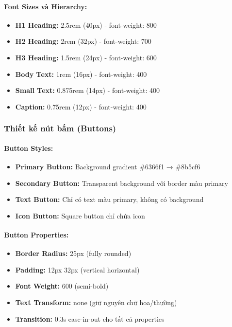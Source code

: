 \paragraph{Font Sizes và Hierarchy:}
\begin{itemize}
    \item \textbf{H1 Heading:} 2.5rem (40px) - font-weight: 800
    \item \textbf{H2 Heading:} 2rem (32px) - font-weight: 700
    \item \textbf{H3 Heading:} 1.5rem (24px) - font-weight: 600
    \item \textbf{Body Text:} 1rem (16px) - font-weight: 400
    \item \textbf{Small Text:} 0.875rem (14px) - font-weight: 400
    \item \textbf{Caption:} 0.75rem (12px) - font-weight: 400
\end{itemize}

\subsubsection{Thiết kế nút bấm (Buttons)}

\paragraph{Button Styles:}
\begin{itemize}
    \item \textbf{Primary Button:} Background gradient \#6366f1 → \#8b5cf6
    \item \textbf{Secondary Button:} Transparent background với border màu primary
    \item \textbf{Text Button:} Chỉ có text màu primary, không có background
    \item \textbf{Icon Button:} Square button chỉ chứa icon
\end{itemize}

\paragraph{Button Properties:}
\begin{itemize}
    \item \textbf{Border Radius:} 25px (fully rounded)
    \item \textbf{Padding:} 12px 32px (vertical horizontal)
    \item \textbf{Font Weight:} 600 (semi-bold)
    \item \textbf{Text Transform:} none (giữ nguyên chữ hoa/thường)
    \item \textbf{Transition:} 0.3s ease-in-out cho tất cả properties
\end{itemize}

